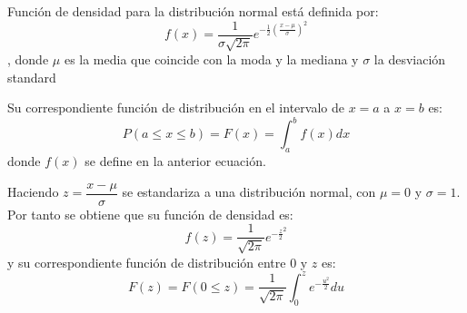 \documentclass[11pt,letterpaper]{article}
\author{Laura Camila Avendaño C.}
\begin{document}
Función de densidad para la distribución normal está definida por:
\[f(x)=\dfrac{1}{\sigma \sqrt{2\pi}}e^{-\frac{1}{2}(\frac{x-\mu}{\sigma})^{2}}\], donde $\mu$ es la media que coincide con la moda y la mediana y $\sigma$ la desviación standard 

Su correspondiente función de distribución en el intervalo de $x=a$ a $x=b$ es:
\[P(a\leq x \leq b)=F(x)=\int_{a}^{b}f(x)dx\] donde $f(x)$ se define en la anterior ecuación.

Haciendo $z=\dfrac{x-\mu}{\sigma}$ se estandariza a una distribución normal, con $\mu=0$ y $\sigma=1$. Por tanto se obtiene que su función de densidad es:
\[f(z)=\dfrac{1}{\sqrt{2\pi}}e^{-\frac{z}{2}^{2}}\]
y su correspondiente función de distribución entre $0$ y $z$ es:
\[F(z)=F(0\leq z)=\dfrac{1}{\sqrt{2\pi}}\int_{0}^{z}e^{-\frac{u^{2}}{2}}du\]
\end{document}

